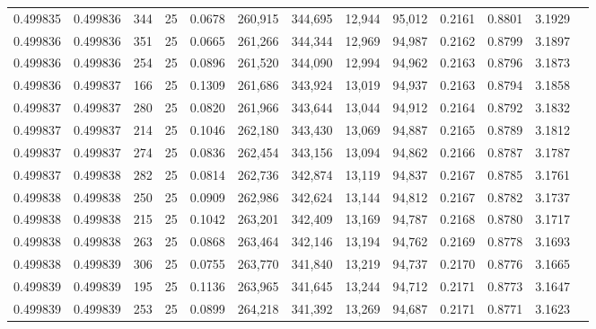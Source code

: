 \begin{tabular}{rrrrrrrrrrrrr}
0.499835 & 0.499836 &   344 &  25 &                                     0.0678 & 260,915 & 344,695 &  12,944 &  95,012 & 0.2161 & 0.8801 & 3.1929 \\
0.499836 & 0.499836 &   351 &  25 &                                     0.0665 & 261,266 & 344,344 &  12,969 &  94,987 & 0.2162 & 0.8799 & 3.1897 \\
0.499836 & 0.499836 &   254 &  25 &                                     0.0896 & 261,520 & 344,090 &  12,994 &  94,962 & 0.2163 & 0.8796 & 3.1873 \\
0.499836 & 0.499837 &   166 &  25 &                                     0.1309 & 261,686 & 343,924 &  13,019 &  94,937 & 0.2163 & 0.8794 & 3.1858 \\
0.499837 & 0.499837 &   280 &  25 &                                     0.0820 & 261,966 & 343,644 &  13,044 &  94,912 & 0.2164 & 0.8792 & 3.1832 \\
0.499837 & 0.499837 &   214 &  25 &                                     0.1046 & 262,180 & 343,430 &  13,069 &  94,887 & 0.2165 & 0.8789 & 3.1812 \\
0.499837 & 0.499837 &   274 &  25 &                                     0.0836 & 262,454 & 343,156 &  13,094 &  94,862 & 0.2166 & 0.8787 & 3.1787 \\
0.499837 & 0.499838 &   282 &  25 &                                     0.0814 & 262,736 & 342,874 &  13,119 &  94,837 & 0.2167 & 0.8785 & 3.1761 \\
0.499838 & 0.499838 &   250 &  25 &                                     0.0909 & 262,986 & 342,624 &  13,144 &  94,812 & 0.2167 & 0.8782 & 3.1737 \\
0.499838 & 0.499838 &   215 &  25 &                                     0.1042 & 263,201 & 342,409 &  13,169 &  94,787 & 0.2168 & 0.8780 & 3.1717 \\
0.499838 & 0.499838 &   263 &  25 &                                     0.0868 & 263,464 & 342,146 &  13,194 &  94,762 & 0.2169 & 0.8778 & 3.1693 \\
0.499838 & 0.499839 &   306 &  25 &                                     0.0755 & 263,770 & 341,840 &  13,219 &  94,737 & 0.2170 & 0.8776 & 3.1665 \\
0.499839 & 0.499839 &   195 &  25 &                                     0.1136 & 263,965 & 341,645 &  13,244 &  94,712 & 0.2171 & 0.8773 & 3.1647 \\
0.499839 & 0.499839 &   253 &  25 &                                     0.0899 & 264,218 & 341,392 &  13,269 &  94,687 & 0.2171 & 0.8771 & 3.1623 \\

\end{tabular}
